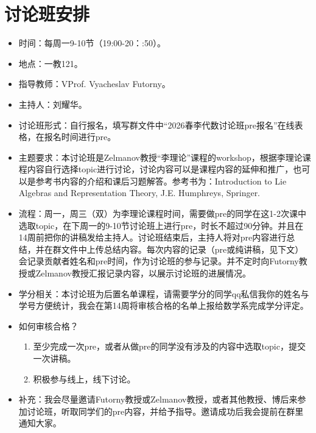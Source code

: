 \documentclass{article}
\begin{document}
\section*{讨论班安排}

\begin{itemize}
\item 时间：每周一9-10节（19:00-20：:50）。
\item 地点：一教121。
\item 指导教师：VProf. Vyacheslav Futorny。
\item 主持人：刘耀华。
\item 讨论班形式：自行报名，填写群文件中“2026春李代数讨论班pre报名”在线表格，在报名时间进行pre。
\item 主题要求：本讨论班是Zelmanov教授“李理论”课程的workshop，根据李理论课程内容自行选择topic进行讨论，讨论内容可以是课程内容的延伸和推广，也可以是参考书内容的介绍和课后习题解答。参考书为：Introduction to Lie Algebras and Representation Theory, J.E. Humphreys, Springer. 
\item 流程：周一，周三（双）为李理论课程时间，需要做pre的同学在这1-2次课中选取topic，在下周一的9-10节讨论班上进行pre，时长不超过90分钟。并且在14周前把你的讲稿发给主持人。讨论班结束后，主持人将对pre内容进行总结，并在群文件中上传总结内容。每次内容的记录（pre或纯讲稿，见下文）会记录贡献者姓名和pre时间，作为讨论班的参与记录。并不定时向Futorny教授或Zelmanov教授汇报记录内容，以展示讨论班的进展情况。
\item 学分相关：本讨论班为后置名单课程，请需要学分的同学qq私信我你的姓名与学号方便统计，我会在第14周将审核合格的名单上报给数学系完成学分评定。
\item 如何审核合格？
     \begin{enumerate}
         \item 至少完成一次pre，或者从做pre的同学没有涉及的内容中选取topic，提交一次讲稿。
         \item 积极参与线上，线下讨论。 
     \end{enumerate}
\item 补充：我会尽量邀请Futorny教授或Zelmanov教授，或者其他教授、博后来参加讨论班，听取同学们的pre内容，并给予指导。邀请成功后我会提前在群里通知大家。
\end{itemize}
\end{document}
